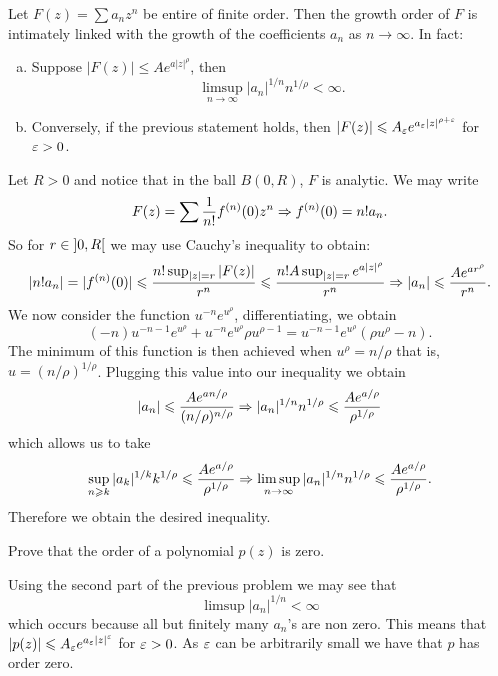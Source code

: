 \documentclass[12pt]{memoir}
\begin{document}
\begin{Ej}
  Let $F(z)=\sum a_nz^n$ be entire of finite order. Then the growth order of $F$ is intimately linked with the growth of the coefficients $a_n$ as $n\to\infty$. In fact:
  \begin{enumerate}[(a)]
    \itemsep=-0.4em
    \item Suppose $|F(z)|\leq Ae^{a|z|^\rho}$, then 
    $$\limsup_{n\to\infty}|a_n|^{1/n}n^{1/\rho}<\infty.$$
    \item Conversely, if the previous statement holds, then $|F(z)|\leqslant A_{\varepsilon}e^{a_\varepsilon|z|^{\rho+\varepsilon}}$ for $\varepsilon>0$.
  \end{enumerate}
    \end{Ej}
\begin{ptcbr}
Let $R>0$ and notice that in the ball $B(0,R)$, $F$ is analytic. We may write 
$$F(z)=\sum \frac{1}{n!}f^{(n)}(0)z^n\Rightarrow f^{(n)}(0)=n!a_n.$$
So for $r\in\left\rbrack0,R\right\lbrack$ we may use Cauchy's inequality to obtain:
$$|n!a_n|=|f^{(n)}(0)|\leqslant\frac{n!\sup_{|z|=r}|F(z)|}{r^n}\leqslant \frac{n!A\sup_{|z|=r}e^{a|z|^\rho}}{r^n}\Rightarrow |a_n|\leqslant\frac{Ae^{ar^\rho}}{r^n}.$$
We now consider the function $u^{-n}e^{u^\rho}$, differentiating, we obtain 
$$(-n)u^{-n-1}e^{u^\rho}+u^{-n}e^{u^\rho}\rho u^{\rho-1}=u^{-n-1}e^{u^\rho}(\rho u^{\rho}-n).$$
The minimum of this function is then achieved when $u^\rho=n/\rho$ that is, $u=(n/\rho)^{1/\rho}$. Plugging this value into our inequality we obtain 
$$|a_n|\leqslant\frac{Ae^{an/\rho}}{(n/\rho)^{n/\rho}}\Rightarrow |a_n|^{1/n}n^{1/\rho}\leqslant\frac{Ae^{a/\rho}}{\rho^{1/\rho}}$$
which allows us to take 
$$\sup_{n\geqslant k}|a_k|^{1/k}k^{1/\rho}\leqslant\frac{Ae^{a/\rho}}{\rho^{1/\rho}}\Rightarrow \limsup_{n\to\infty}|a_n|^{1/n}n^{1/\rho}\leqslant \frac{Ae^{a/\rho}}{\rho^{1/\rho}}.$$
Therefore we obtain the desired inequality.
\end{ptcbr}

\begin{Ej}[Re-do of 5.2(a)]
    Prove that the order of a polynomial $p(z)$ is zero.
\end{Ej}

\begin{ptcbr}
    Using the second part of the previous problem we may see that 
    $$\limsup |a_n|^{1/n}<\infty$$
    which occurs because all but finitely many $a_n$'s are non zero. This means that $
    |p(z)|\leqslant A_\varepsilon e^{a_\varepsilon|z|^{\varepsilon}}$ for $\varepsilon>0$. As $\varepsilon$ can be arbitrarily small we have that $p$ has order zero.
\end{ptcbr}
\end{document}
